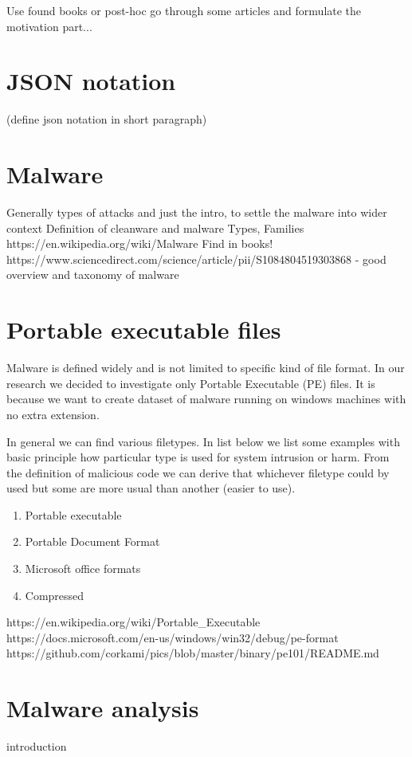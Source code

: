 Use found books or post-hoc go through some articles and formulate the motivation part...

\section{JSON notation} \label{sec:json_notation}
(define json notation in short paragraph)




\section{Malware}
Generally types of attacks and just the intro, to settle the malware into wider context
Definition of cleanware and malware
Types, Families
https://en.wikipedia.org/wiki/Malware
Find in books!
https://www.sciencedirect.com/science/article/pii/S1084804519303868 - good overview and taxonomy of malware

\section{Portable executable files}
Malware is defined widely and is not limited to specific kind of file format. In our research we decided to investigate only Portable Executable (PE) files. It is because we want to create dataset of malware running on windows machines with no extra extension. 

In general we can find various filetypes. In list below we list some examples with basic principle how particular type is used for system intrusion or harm. From the definition of malicious code we can derive that whichever filetype could by used but some are more usual than another (easier to use).
\begin{enumerate}
  \item Portable executable
  \item Portable Document Format
  \item Microsoft office formats
  \item Compressed
\end{enumerate}

https://en.wikipedia.org/wiki/Portable_Executable
https://docs.microsoft.com/en-us/windows/win32/debug/pe-format
https://github.com/corkami/pics/blob/master/binary/pe101/README.md

\section{Malware analysis}
introduction


